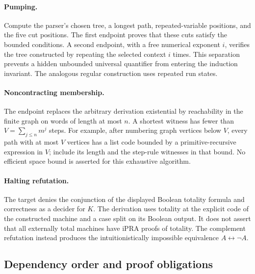 \paragraph{Pumping.}
Compute the parser's chosen tree, a longest path, repeated-variable
positions, and the five cut positions. The first endpoint proves that
these cuts satisfy the bounded conditions. A second endpoint, with a
free numerical exponent $i$, verifies the tree constructed by repeating
the selected context $i$ times. This separation prevents a hidden
unbounded universal quantifier from entering the induction invariant.
The analogous regular construction uses repeated run states.

\paragraph{Noncontracting membership.}
The endpoint replaces the arbitrary derivation existential by reachability
in the finite graph on words of length at most $n$. A shortest witness has
fewer than $V=\sum_{j\le n}m^j$ steps. For example, after numbering graph
vertices below $V$, every path with at most $V$ vertices has a list code
bounded by a primitive-recursive expression in $V$; include its length
and the step-rule witnesses in that bound. No efficient space bound is
asserted for this exhaustive algorithm.

\paragraph{Halting refutation.}
The target denies the conjunction of the displayed Boolean totality formula
and correctness as a decider for $K$. The derivation uses totality at the
explicit code of the constructed machine and a case split on its Boolean
output. It does not assert that all externally total machines have
iPRA proofs of totality. The complement refutation instead produces the
intuitionistically impossible equivalence $A\leftrightarrow\neg A$.

\subsection{Dependency order and proof obligations}

